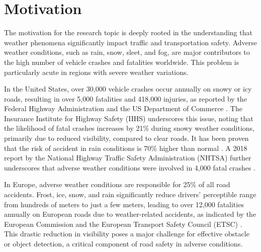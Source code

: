 \documentclass[report.tex]{subfiles}
\begin{document}

        
    
    \section{Motivation}

        The motivation for the research topic is deeply rooted in the understanding that weather phenomena significantly impact traffic and transportation safety. Adverse weather conditions, such as rain, snow, sleet, and fog, are major contributors to the high number of vehicle crashes and fatalities worldwide. This problem is particularly acute in regions with severe weather variations.

        In the United States, over 30,000 vehicle crashes occur annually on snowy or icy roads, resulting in over 5,000 fatalities and 418,000 injuries, as reported by the Federal Highway Administration \cite{federal-highway-administration-no-date} and the US Department of Commerce \cite{usDepartmentofCommerce2016}. The Insurance Institute for Highway Safety (IIHS) underscores this issue, noting that the likelihood of fatal crashes increases by 21\% during snowy weather conditions, primarily due to reduced visibility, compared to clear roads. It has been proven that the risk of accident in rain conditions is 70\% higher than normal \cite{andrey1993temporal}. A 2018 report by the National Highway Traffic Safety Administration (NHTSA) further underscores that adverse weather conditions were involved in 4,000 fatal crashes \cite{brumbelow2022light}.
        
        In Europe, adverse weather conditions are responsible for 25\% of all road accidents. Frost, ice, snow, and rain significantly reduce drivers' perceptible range from hundreds of meters to just a few meters, leading to over 12,000 fatalities annually on European roads due to weather-related accidents, as indicated by the European Commission and the European Transport Safety Council (ETSC) \cite{cookson-2022}. This drastic reduction in visibility poses a major challenge for effective obstacle or object detection, a critical component of road safety in adverse conditions.
\end{document}
